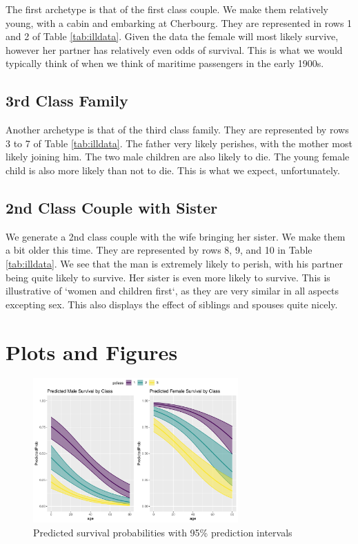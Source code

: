 \documentclass[]{extarticle}
\begin{document}
The first archetype is that of the first class couple. We make them relatively young, with a cabin and embarking at Cherbourg. They are represented in rows 1 and 2 of Table \ref{tab:illdata}. Given the data the female will most likely survive, however her partner has relatively even odds of survival. This is what we would typically think of when we think of maritime passengers in the early 1900s.

\subsection{3rd Class Family}

Another archetype is that of the third class family. They are represented by rows 3 to 7 of Table \ref{tab:illdata}. The father very likely perishes, with the mother most likely joining him. The two male children are also likely to die. The young female child is also more likely than not to die. This is what we expect, unfortunately.

\subsection{2nd Class Couple with Sister}

We generate a 2nd class couple with the wife bringing her sister. We make them a bit older this time. They are represented by rows 8, 9, and 10 in Table \ref{tab:illdata}. We see that the man is extremely likely to perish, with his partner being quite likely to survive. Her sister is even more likely to survive. This is illustrative of `women and children first`, as they are very similar in all aspects excepting sex. This also displays the effect of siblings and spouses quite nicely.

%

\appendix

\section{Plots and Figures}

\begin{figure}[H]
	\centering
	\includegraphics[width=0.7\textwidth]{psurvage}
	\caption{Predicted survival probabilities with 95\% prediction intervals}
	\label{fig:psurvage}
\end{figure}
\end{document}
